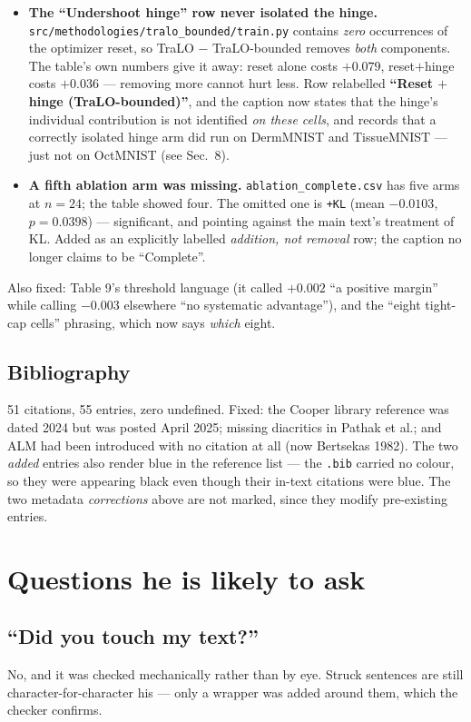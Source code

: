 \documentclass[11pt,a4paper]{article}
\begin{document}
\begin{itemize}
\item \textbf{The ``Undershoot hinge'' row never isolated the hinge.}
\texttt{src/methodologies/tralo\_bounded/train.py} contains \emph{zero} occurrences of the
optimizer reset, so TraLO $-$ TraLO-bounded removes \emph{both} components. The table's own
numbers give it away: reset alone costs $+0.079$, reset$+$hinge costs $+0.036$ --- removing
more cannot hurt less. Row relabelled \textbf{``Reset $+$ hinge (TraLO-bounded)''}, and the
caption now states that the hinge's individual contribution is not identified \emph{on
these cells}, and records that a correctly isolated hinge arm did run on DermMNIST and
TissueMNIST --- just not on OctMNIST (see Sec.~8).
\item \textbf{A fifth ablation arm was missing.}
\texttt{ablation\_complete.csv} has five arms at $n{=}24$; the table showed four. The
omitted one is \texttt{+KL} (mean $-0.0103$, $p{=}0.0398$) --- significant, and pointing
against the main text's treatment of KL. Added as an explicitly labelled
\emph{addition, not removal} row; the caption no longer claims to be ``Complete''.
\end{itemize}

\noindent Also fixed: Table 9's threshold language (it called $+0.002$ ``a positive
margin'' while calling $-0.003$ elsewhere ``no systematic advantage''), and the
``eight tight-cap cells'' phrasing, which now says \emph{which} eight.

\subsection{Bibliography}
51 citations, 55 entries, zero undefined. Fixed: the Cooper library reference was dated
2024 but was posted April 2025; missing diacritics in Pathak et al.; and ALM had been
introduced with no citation at all (now Bertsekas 1982). The two \emph{added} entries also
render blue in the reference list --- the \texttt{.bib} carried no colour, so they were
appearing black even though their in-text citations were blue. The two metadata
\emph{corrections} above are not marked, since they modify pre-existing entries.

\section{Questions he is likely to ask}

\subsection{``Did you touch my text?''}
No, and it was checked mechanically rather than by eye. Struck sentences are still
character-for-character his --- only a wrapper was added around them, which the checker
confirms.
\end{document}

